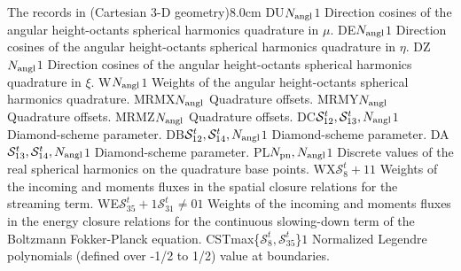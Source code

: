 \begin{DescriptionEnregistrement}{The  records in
 (Cartesian 3-D geometry)}{8.0cm}
\RealEnr
  {DU}{$N_{\rm angl}$}{$1$}
  {Direction cosines of the angular height-octants spherical harmonics quadrature in $\mu$.} 
\RealEnr
  {DE}{$N_{\rm angl}$}{$1$}
  {Direction cosines of the angular height-octants spherical harmonics quadrature in $\eta$.} 
\RealEnr
  {DZ}{$N_{\rm angl}$}{$1$}
  {Direction cosines of the angular height-octants spherical harmonics quadrature in $\xi$.} 
\RealEnr
  {W}{$N_{\rm angl}$}{$1$}
  {Weights of the angular height-octants spherical harmonics quadrature.} 
\IntEnr
  {MRMX}{$N_{\rm angl}$}
  {Quadrature offsets.} 
\IntEnr
  {MRMY}{$N_{\rm angl}$}
  {Quadrature offsets.} 
\IntEnr
  {MRMZ}{$N_{\rm angl}$}
  {Quadrature offsets.} 
\RealEnr
  {DC}{$\mathcal{S}^{t}_{12},\mathcal{S}^{t}_{13},N_{\rm angl}$}{$1$}
  {Diamond-scheme parameter.} 
\RealEnr
  {DB}{$\mathcal{S}^{t}_{12},\mathcal{S}^{t}_{14},N_{\rm angl}$}{$1$}
  {Diamond-scheme parameter.} 
\RealEnr
  {DA}{$\mathcal{S}^{t}_{13},\mathcal{S}^{t}_{14},N_{\rm angl}$}{$1$}
  {Diamond-scheme parameter.} 
\RealEnr
  {PL}{$N_{\rm pn},N_{\rm angl}$}{$1$}
  {Discrete values of the real spherical harmonics on the quadrature base points.} 
\RealEnr
  {WX}{$\mathcal{S}^{t}_{8}+1$}{$1$}
  {Weights of the incoming and moments fluxes in the spatial closure relations for the streaming term.}
\OptRealEnr
  {WE}{$\mathcal{S}^{t}_{35}+1$}{$\mathcal{S}^{t}_{31}\neq0$}{$1$}
  {Weights of the incoming and moments fluxes in the energy closure relations for the continuous slowing-down term of the Boltzmann Fokker-Planck equation.}
\RealEnr
  {CST}{max\{$\mathcal{S}^{t}_{8},\mathcal{S}^{t}_{35}$\}}{$1$}
  {Normalized Legendre polynomials (defined over -1/2 to 1/2) value at boundaries.}
\end{DescriptionEnregistrement}

\eject

